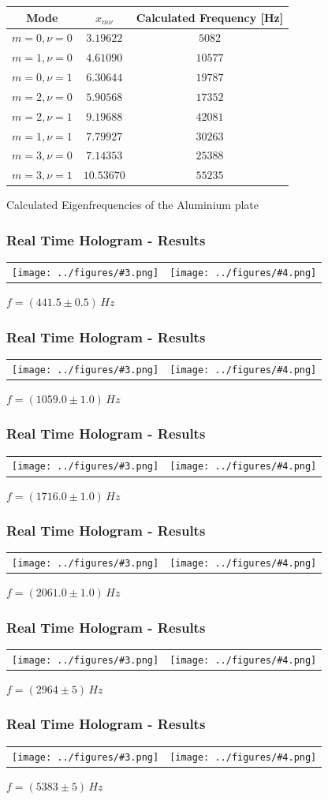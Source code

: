 \documentclass{beamer}
\newcommand{\graTwoOneC}[5]{
	\begin{table}
		\centering
		\begin{tabular}[width=\textwidth]{cc}
			\texttt{[image: ../figures/\#3.png]}&
			\texttt{[image: ../figures/\#4.png]}\\
		\end{tabular}
		#5
	\end{table}
}
\begin{document}
\begin{frame}
	\begin{table}[h]
		\centering
		\begin{tabular}{c|c|c}
			Mode 		& $x_{m\nu}$ & Calculated Frequency [Hz] 	 \\ \hline\hline
			$m=0,\nu=0$	&$3.19622$   &$5082$						\\ \hline
			$m=1,\nu=0$	& $4.61090$  & $10577$					\\ \hline
			$m=0,\nu=1$	& $6.30644$  & $19787$					\\ \hline
			$m=2,\nu=0$	& $5.90568$  & $17352$					\\ \hline
			$m=2,\nu=1$	& $9.19688$  & $42081$					\\ \hline
			$m=1,\nu=1$	& $7.79927$  & $30263$				     \\ \hline
			$m=3,\nu=0$	& $7.14353$  & $25388$                \\ \hline
			$m=3,\nu=1$	& $10.53670$ & $55235$
		\end{tabular} \vskip 0.2cm
		{Calculated Eigenfrequencies of the Aluminium plate}
	\end{table}	
\end{frame}
\begin{frame}
	\frametitle{Real Time Hologram - Results}
	\graTwoOneC{0.65}{0.34}{aluminium2_edit}{aluminium2_lit}{$f=(441.5\pm0.5)\,\si{Hz}$}
\end{frame}
\begin{frame}
	\frametitle{Real Time Hologram - Results}
	\graTwoOneC{0.65}{0.34}{aluminium3_edit}{aluminium3_lit}{$f=(1059.0\pm1.0)\,\si{Hz}$}
\end{frame}
\begin{frame}
	\frametitle{Real Time Hologram - Results}
	\graTwoOneC{0.65}{0.34}{aluminium6_edit}{aluminium6_lit}{$f=(1716.0\pm1.0)\,\si{Hz}$}
\end{frame}
\begin{frame}
	\frametitle{Real Time Hologram - Results}
	\graTwoOneC{0.65}{0.34}{aluminium7_edit}{aluminium7_lit}{$f=(2061.0\pm1.0)\,\si{Hz}$}
\end{frame}
\begin{frame}
	\frametitle{Real Time Hologram - Results}
	\graTwoOneC{0.65}{0.34}{aluminium9_edit}{aluminium9_lit}{$f=(2964\pm5)\,\si{Hz}$}
\end{frame}
\begin{frame}
	\frametitle{Real Time Hologram - Results}
	\graTwoOneC{0.65}{0.34}{aluminium10_edit}{aluminium10_lit}{$f=(5383\pm5)\,\si{Hz}$}
\end{frame}
\end{document}
